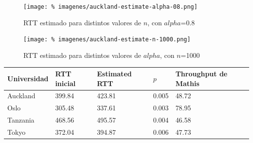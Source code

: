 \documentclass[final,inline,a4paper,narroweqnarray]{ieee}
\begin{document}
\begin{figure}[ht]\begin{center}
   \texttt{[image: \%
    imagenes/auckland-estimate-alpha-08.png]}
    \caption{RTT estimado para distintos valores de $n$, con $alpha$=0.8}
    \label{auckland-estimate-alpha-08}
\end{center}\end{figure}

\begin{figure}[ht]\begin{center}
   \texttt{[image: \%
    imagenes/auckland-estimate-n-1000.png]}
    \caption{RTT estimado para distintos valores de $alpha$, con $n$=1000}
    \label{auckland-estimate-n-1000}
\end{center}\end{figure}

\begin{tabular}{| p{1.6cm} | p{1.2cm} | p{1.4cm} | p{1.2cm} | p{1.7cm} |}
  \hline
  Universidad & RTT inicial & Estimated RTT & $p$ & Throughput de Mathis \\
  \hline
  Auckland & 399.84 & 423.81 & 0.005 & 48.72 \\
  Oslo & 305.48 & 337.61 & 0.003 & 78.95 \\
  Tanzania & 468.56 & 495.57 & 0.004 & 46.58 \\
  Tokyo & 372.04 & 394.87 & 0.006 & 47.73 \\
  \hline
\end{tabular}
\end{document}
